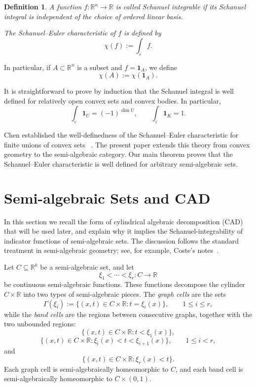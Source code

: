 \documentclass[11pt]{article}
\newtheorem{definition}[theorem]{Definition}
\theoremstyle{remark}
\newcommand{\R}{\mathbb R}
\newcommand{\sub}{\subset}
\newcommand{\eps}{\varepsilon}
\newcommand{\1}{\mathbf 1}
\begin{document}
\begin{definition}
A function $f:\R^n\to\R$ is called Schanuel integrable if its Schanuel integral is independent of the choice of ordered linear basis.

The Schanuel--Euler characteristic of $f$ is defined by
\[
\chi(f)
:=
\int_\eps f.
\]
\end{definition}

In particular, if $A\sub\R^n$ is a subset and $f=\mathbf 1_A$, we define
\[
\chi(A):=\chi(\mathbf 1_A).
\]

It is straightforward to prove by induction that the Schanuel integral is well defined for relatively open convex sets and convex bodies. In particular,
\[
\int_\varepsilon \mathbf 1_U=(-1)^{\dim U},
\qquad
\int_\varepsilon \mathbf 1_K=1.
\]

Chen established the well-definedness of the Schanuel--Euler characteristic for finite unions of convex sets ~\cite{chen1993euler}. 
The present paper extends this theory from convex geometry to the semi-algebraic category. Our main theorem proves that the Schanuel--Euler characteristic is well defined for arbitrary semi-algebraic sets.


\section{Semi-algebraic Sets and CAD}

In this section we recall the form of cylindrical algebraic decomposition
(CAD) that will be used later, and explain why it implies the
Schanuel-integrability of indicator functions of semi-algebraic sets.  The
discussion follows the standard treatment in semi-algebraic geometry; see, for
example, Coste's notes~\cite{coste2002introduction}.

Let \(C \subseteq \mathbb{R}^{k}\) be a semi-algebraic set, and let
\[
  \xi_1 < \cdots < \xi_r : C \longrightarrow \mathbb{R}
\]
be continuous semi-algebraic functions.  These functions decompose the cylinder
\(C \times \mathbb{R}\) into two types of semi-algebraic pieces.  The
\emph{graph cells} are the sets
\[
  \Gamma(\xi_i)
  :=
  \{(x,t)\in C\times \mathbb{R} : t=\xi_i(x)\},
  \qquad 1\leq i\leq r,
\]
while the \emph{band cells} are the regions between consecutive graphs, together
with the two unbounded regions:
\[
  \{(x,t)\in C\times \mathbb{R}: t<\xi_1(x)\},
\]
\[
  \{(x,t)\in C\times \mathbb{R}: \xi_i(x)<t<\xi_{i+1}(x)\},
  \qquad 1\leq i<r,
\]
and
\[
  \{(x,t)\in C\times \mathbb{R}: \xi_r(x)<t\}.
\]
Each graph cell is semi-algebraically homeomorphic to \(C\), and each band cell
is semi-algebraically homeomorphic to \(C\times (0,1)\).
\end{document}
